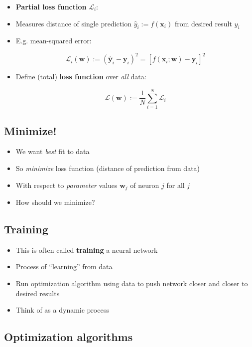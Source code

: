 \begin{itemize}
\item
  \textbf{Partial loss function} \(\mathcal{L}_i\):
\item
  Measures distance of single prediction
  \(\hat{y}_i := f(\mathbf{x}_i)\) from desired result \(y_i\)
\item
  E.g. mean-squared error:

  \[\mathcal{L}_i(\mathbf{w}):= (\hat{\mathbf{y}}_i - \mathbf{y}_i)^2
    = \left[f(\mathbf{x}_i; \mathbf{w} ) - \mathbf{y}_i \right]^2
    \]
\item
  Define (total) \textbf{loss function} over \emph{all} data:

  \[\mathcal{L}(\mathbf{w}) := \frac{1}{N} \sum_{i=1}^N \mathcal{L}_i\]
\end{itemize}

\hypertarget{minimize}{%
\subsection{Minimize!}\label{minimize}}

\begin{itemize}
\item
  We want \emph{best} fit to data
\item
  So \emph{minimize} loss function (distance of prediction from data)
\item
  With respect to \emph{parameter} values \(\mathbf{w}_j\) of neuron
  \(j\) for all \(j\)
\item
  How should we minimize?
\end{itemize}

\hypertarget{training}{%
\subsection{Training}\label{training}}

\begin{itemize}
\item
  This is often called \textbf{training} a neural network
\item
  Process of ``learning'' from data
\item
  Run optimization algorithm using data to push network closer and
  closer to desired results
\item
  Think of as a dynamic process
\end{itemize}

\hypertarget{optimization-algorithms}{%
\subsection{Optimization algorithms}\label{optimization-algorithms}}

